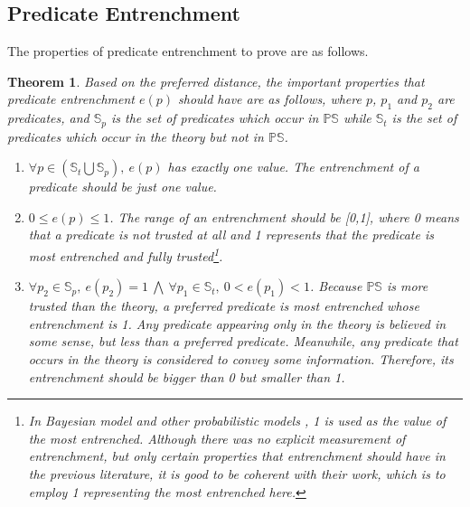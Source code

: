 \documentclass[11pt,letterpaper]{article}
\newtheorem{theorem}{Theorem}[section]
\newcommand{\ps}{\mathbb{PS}}
\begin{document}
\subsection{Predicate Entrenchment}
The properties of predicate entrenchment to prove are as follows.
\begin{theorem}
\label{spec:pe}
Based on the  preferred distance, the important properties that predicate entrenchment $e(p)$ should have are as follows, where $p$, $p_{1}$ and $p_{2}$ are predicates, and $\mathbb{S}_{p}$ is the set of predicates which occur in $\ps$ while $\mathbb{S}_{t}$ is the set of predicates which occur in the theory but not in $\ps$.
\begin{enumerate}
\item $\forall p \in (\mathbb{S}_{t} \bigcup \mathbb{S}_{p}),\ e(p)$ has exactly one value.\newline
\textnormal{The entrenchment of a predicate should be just one value.}
\item $ 0 \leq e(p) \leq 1$. \newline
\textnormal{The range of an entrenchment should be [0,1], where 0 means that a predicate is not trusted at all and 1  represents that the predicate is most entrenched and fully trusted\footnote{In  Bayesian model and other probabilistic models \cite{gardenfors1988knowledge}, 1 is used as the value of the most entrenched. Although there was no explicit measurement of entrenchment, but only  certain properties that entrenchment should have in the previous literature, it is good to be coherent with their work, which is to employ 1 representing the most entrenched here.}.}

\item $\forall p_{2} \in \mathbb{S}_{p},\  e(p_{2})=1\ \bigwedge \  \forall p_{1}\in \mathbb{S}_{t},\  0< e(p_{1}) < 1$.\newline
\textnormal{Because $\ps$ is more trusted than the theory, a preferred predicate is most entrenched whose entrenchment is 1. Any predicate appearing only in the theory is believed in some sense, but less than a preferred predicate. Meanwhile, any predicate that occurs in the theory is considered to convey some information. Therefore, its entrenchment should be bigger than 0 but smaller than 1.  }


\end{enumerate}
\end{theorem}
\end{document}
